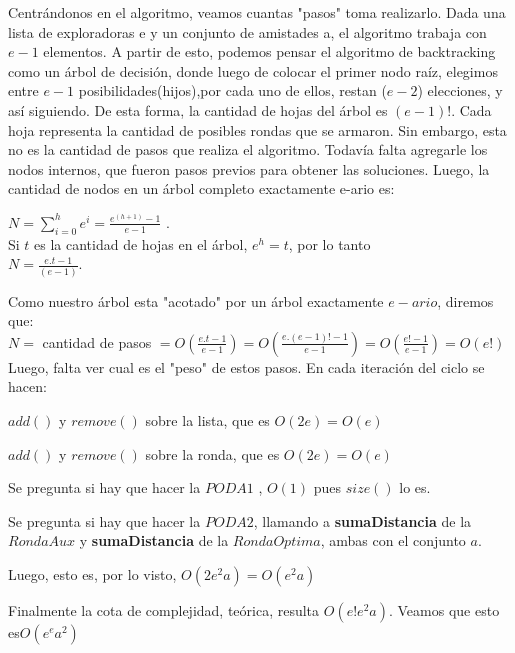 \documentclass[10pt, a4paper]{article}
\begin{document}
Centrándonos en el algoritmo, veamos cuantas "pasos" toma realizarlo.  Dada una lista de exploradoras e y un conjunto de amistades a, el algoritmo trabaja con $e-1$ elementos. A partir de esto, podemos pensar el algoritmo de backtracking como un árbol de decisión, donde luego de colocar el primer nodo raíz, elegimos entre $e-1$ posibilidades(hijos),por cada uno de ellos, restan ($e-2$) elecciones, y así siguiendo. De esta forma, la cantidad de hojas del árbol es $(e-1)!$. Cada hoja representa la cantidad de posibles rondas que se armaron. Sin embargo, esta no es la cantidad de pasos que realiza el algoritmo. Todavía falta agregarle los nodos internos, que fueron pasos previos para obtener las soluciones. Luego, la cantidad de nodos en un árbol completo  exactamente e-ario es:

\hspace{60mm}$N = \sum\limits_{i=0}^h e ^i = \frac{e^{(h+1)} -1}{e-1} $ . \\


Si $t$ es la cantidad de hojas en el árbol, $e^{h} = t$, por lo tanto  \\


\hspace{60mm} $N = \frac{e.t -1}{(e-1)}$.

Como nuestro árbol esta "acotado" por un árbol exactamente  $e-ario$, diremos que:\\

\hspace{30mm}$N = $ cantidad de pasos $= O(\frac{e.t -1}{e-1}) = O(\frac{e.(e-1)! -1}{e-1}) = O(\frac{e! -1}{e-1}) = O(e!)$\\

Luego, falta ver cual es el "peso" de estos pasos. En cada iteración del ciclo se hacen:

$add()$ y $remove()$ sobre la lista, que es $O(2e) = O(e)$

$add()$ y $remove()$ sobre la ronda, que es $O(2e) = O(e)$

Se pregunta si hay que hacer la $PODA1$ , $O(1)$ pues $size()$ lo es.

Se pregunta si hay que hacer la $PODA2$, llamando a \textbf{sumaDistancia} de la $RondaAux$ y \textbf{sumaDistancia} de la $RondaOptima$, ambas con el conjunto $a$. 

Luego, esto es, por lo visto, $O(2e^{2}a) = O(e^{2}a)$

Finalmente la cota de complejidad, teórica, resulta $O(e!e^{2}a)$. Veamos que esto es$ O(e^{e}a^{2})$
\end{document}
